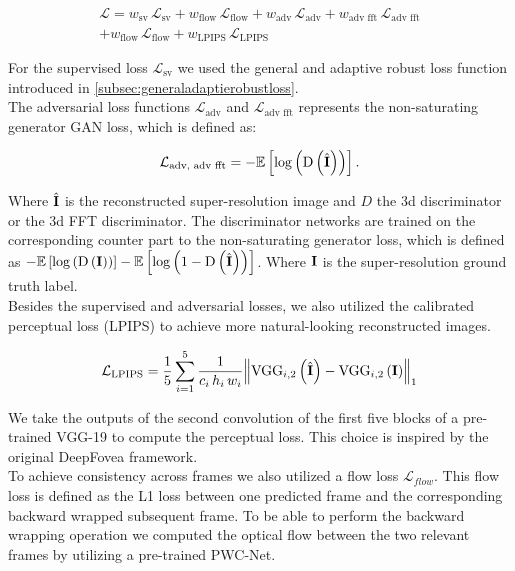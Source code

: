 \documentclass[10pt,twocolumn,letterpaper]{article}
\newcommand{\Tensor}[1]{\boldsymbol{\mathrm{\MakeUppercase{#1}}}}
\newcommand{\Mean}[1]{\mathbb{E}\left[#1\right]}
\begin{document}
	\begin{multline} \label{eq:loss}
		\mathcal{L}=w_{\text{sv}}\,\mathcal{L}_{\text{sv}} + w_{\text{flow}}\,\mathcal{L}_{\text{flow}} + w_{\text{adv}}\,\mathcal{L}_{\text{adv}} + w_{\text{adv fft}}\,\mathcal{L}_{\text{adv fft}}\\
		+ w_{\text{flow}}\,\mathcal{L}_{\text{flow}} + w_{\text{LPIPS}}\,\mathcal{L}_{\text{LPIPS}}    
	\end{multline}
	
	For the supervised loss $\mathcal{L}_{\text{sv}}$ we used the general and adaptive robust loss function introduced in \ref{subsec:generaladaptierobustloss}.\cite{adaptiveroubustloss}\\
	The adversarial loss functions $\mathcal{L}_{\text{adv}}$ and $\mathcal{L}_{\text{adv fft}}$ represents the non-saturating generator GAN loss, which is defined as: \cite{gan}
	
	\begin{equation}
		\mathcal{L}_{\text{adv, adv fft}}=-\Mean{\log \left(\operatorname{D}\left(\hat{\Tensor{I}}\right)\right)}.
	\end{equation}
	
	Where $\hat{\Tensor{I}}$ is the reconstructed super-resolution image and $D$ the 3d discriminator or the 3d FFT discriminator. The discriminator networks are trained on the corresponding counter part to the non-saturating generator loss, which is defined as $-\Mean{\log\left(\operatorname{D}\left(\Tensor{I}\right)\right)}-\Mean{\log\left(1-\operatorname{
			D}\left(\hat{\Tensor{I}}\right)\right)}$. Where $\Tensor{I}$ is the super-resolution ground truth label. \cite{gan}\\
	Besides the supervised and adversarial losses, we also utilized the calibrated perceptual loss (LPIPS) \cite{perceptual} to achieve more natural-looking reconstructed images.
	
	\begin{equation}
		\mathcal{L}_{\text{LPIPS}} = \frac{1}{5}\sum_{i=1}^{5}\frac{1}{c_{i}\,h_{i}\,w_{i}}\norm{\operatorname{VGG}_{i,2}\left(\hat{\Tensor{I}}\right) - \operatorname{VGG}_{i,2}\left(\Tensor{I}\right)}_{1}
	\end{equation}
	
	We take the outputs of the second convolution of the first five blocks of a pre-trained VGG-19 to compute the perceptual loss. This choice is inspired by the original DeepFovea framework. \cite{vgg, deepfovea}\\
	To achieve consistency across frames we also utilized a flow loss $\mathcal{L}_{flow}$. This flow loss is defined as the L1 loss between one predicted frame and the corresponding backward wrapped subsequent frame. To be able to perform the backward wrapping operation we computed the optical flow between the two relevant frames by utilizing a pre-trained PWC-Net. \cite{deepfovea, pwcnet}
	
\end{document}
